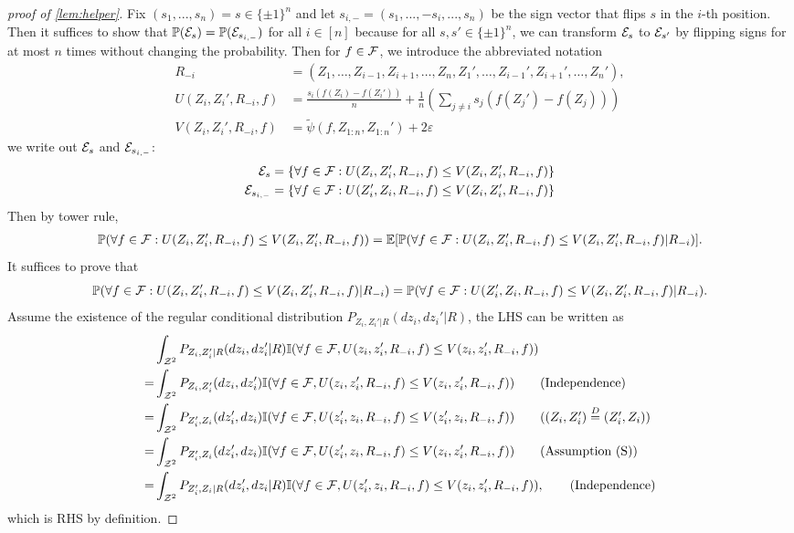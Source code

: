 \documentclass[twoside]{article}
\begin{document}
\begin{proof}[proof of \cref{lem:helper}]
   Fix $(s_1,...,s_n)=s\in \{\pm 1\}^n$ and let $s_{i,-}=(s_1,...,-s_i,...,s_n)$ be the sign vector that flips $s$ in the $i$-th position. Then it suffices to show that $\mathbb{P}(\mathcal{E}_{s})=\mathbb{P}(\mathcal{E}_{s_{i,-}})$ for all $i\in [n]$ because for all $s,s'\in \{\pm 1\}^n$, we can transform $\mathcal{E}_s$ to $\mathcal{E}_{s'}$ by flipping signs for at most $n$ times without changing the probability. Then for $f\in \mathcal{F}$, we introduce the abbreviated notation 
   \begin{align*}
      R_{-i}&=(Z_1,\dotsc, Z_{i-1},Z_{i+1},\dotsc, Z_n,Z_1',\dotsc, Z_{i-1}',Z_{i+1}',\dotsc, Z_n'), \\
      U(Z_i,Z_i',R_{-i},f)&=\frac{s_i(f(Z_i)-f(Z_i'))}{n}+\frac{1}{n}\left(\sum_{j\neq i}s_j( f(Z_j')-f(Z_j))\right)\\
      V(Z_i,Z_i',R_{-i},f)&=\tilde\psi(f,Z_{1:n}, Z_{1:n}')+2\varepsilon
   \end{align*} 
   we write out $\mathcal{E}_s$ and $\mathcal{E}_{s_{i,-}}$:
   \begin{align*}
      \mathcal{E}_s&=\left\{\forall f\in \mathcal{F}:U(Z_i,Z_i',R_{-i},f)\le V(Z_i,Z_i',R_{-i},f)\right\}\\
      \mathcal{E}_{s_{i,-}}&=\left\{\forall f\in \mathcal{F}:U(Z_i',Z_i,R_{-i},f)\le V(Z_i,Z_i',R_{-i},f)\right\}
   \end{align*}
   Then by tower rule,
   \begin{align*}
      \mathbb{P}(\forall f\in \mathcal{F}:U(Z_i,Z_i',R_{-i},f)\le V(Z_i,Z_i',R_{-i},f))=\mathbb{E}[\mathbb{P}(\forall f\in \mathcal{F}:U(Z_i,Z_i',R_{-i},f)\le V(Z_i,Z_i',R_{-i},f)\vert R_{-i})].
   \end{align*}
   It suffices to prove that \[\mathbb{P}(\forall f\in \mathcal{F}:U(Z_i,Z_i',R_{-i},f)\le V(Z_i,Z_i',R_{-i},f)\vert R_{-i})=\mathbb{P}(\forall f\in \mathcal{F}:U(Z_i',Z_i,R_{-i},f)\le V(Z_i,Z_i',R_{-i},f)\vert R_{-i}).\]
   Assume the existence of the regular conditional distribution $P_{Z_i,Z_i'\vert R}(dz_i,dz_i'|R)$, the LHS can be written as 
   \begin{align*}
      &\int_{\cZ^2}P_{Z_i,Z_i'\vert R}(dz_i,dz_i'|R)\mathbb I(\forall f\in \cF,U(z_i,z_i',R_{-i},f)\le V(z_i,z_i',R_{-i},f))\\
      =&\int_{\cZ^2} P_{Z_i,Z_i'}(dz_i,dz_i')\mathbb I(\forall f\in \cF,U(z_i,z_i',R_{-i},f)\le V(z_i,z_i',R_{-i},f))\tag{Independence}\\
      =&\int_{\cZ^2} P_{Z_i',Z_i}(dz_i',dz_i)\mathbb I(\forall f\in \cF,U(z_i',z_i,R_{-i},f)\le V(z_i',z_i,R_{-i},f))\tag{$(Z_i,Z_i')\stackrel{D}{=}(Z_i',Z_i)$}\\
      =&\int_{\cZ^2}P_{Z_i',Z_i}(dz_i',dz_i)\mathbb I(\forall f\in \cF,U(z_i',z_i,R_{-i},f)\le V(z_i,z_i',R_{-i},f))\tag{Assumption (S)}\\
      =&\int_{\cZ^2}P_{Z_i',Z_i|R}(dz_i',dz_i|R)\mathbb I(\forall f\in \cF,U(z_i',z_i,R_{-i},f)\le V(z_i,z_i',R_{-i},f)),\tag{Independence}
   \end{align*}
   which is RHS by definition.
\end{proof}
\end{document}

